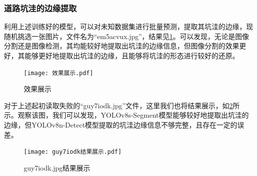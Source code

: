 \documentclass{MathorCupmodeling}
\begin{document}
	\subsubsection{道路坑洼的边缘提取}
	利用上述训练好的模型，可以对未知数据集进行批量预测，提取其坑洼的边缘，现随机挑选一张图片，文件名为“em5acvux.jpg”，结果见\textcolor{blue}{\cref{fig:效果展示}}。可以发现，无论是图像分割还是图像检测，其均能较好地提取出坑洼的边缘信息，但图像分割的效果更好，其能够更好地提取出坑洼的边缘，且能够将坑洼的形态进行较好的还原。
	\begin{figure}[H]
		\centering
		\texttt{[image: 效果展示.pdf]}
		\caption{效果展示}
		\label{fig:效果展示}
	\end{figure}
	对于上述起初读取失败的“guy7iodk.jpg”文件，这里我们也将结果展示，如\textcolor{blue}{\cref{fig:guy7iodk结果展示}}所示。观察该图，我们可以发现，YOLOv8s-Segment模型能够较好地提取出坑洼的边缘，但YOLOv8n-Detect模型提取的坑洼边缘信息不够完整，且存在一定的误差。
	\begin{figure}[H]
		\centering
		\texttt{[image: guy7iodk结果展示.pdf]}
		\caption{guy7iodk.jpg结果展示}
		\label{fig:guy7iodk结果展示}
	\end{figure}
\end{document}
